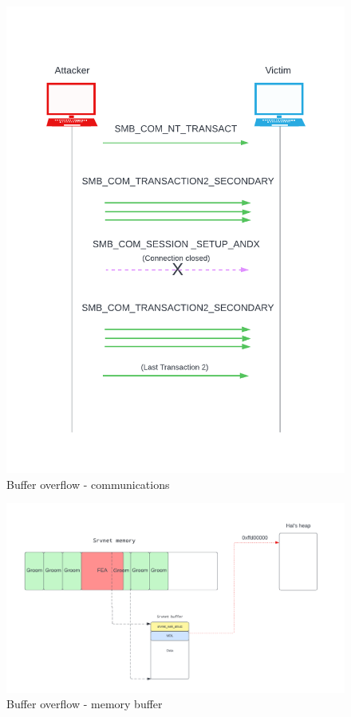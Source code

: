 \begin{figure}[ht!]
    \centering
      \includegraphics[scale=0.5]{images/exploit_5_comm.png}
      \caption{Buffer overflow - communications}
\end{figure}

\begin{figure}[ht!]
    \centering
      \includegraphics[scale=0.5]{images/exploit_5_buff.png}
      \caption{Buffer overflow - memory buffer}
\end{figure}

